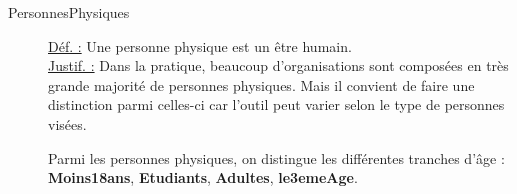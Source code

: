 \begin{description}
\item [PersonnesPhysiques]
\underline{Déf. :}  Une personne physique est un être humain.
\\ \underline{Justif. :}  Dans la pratique,  beaucoup d'organisations sont composées en très grande majorité de personnes physiques.  Mais il convient de faire une distinction parmi celles-ci car  l'outil peut varier  selon le type de personnes visées.
\newline

Parmi les personnes physiques,  on distingue les différentes tranches d'âge : \textbf{Moins18ans}, \textbf{Etudiants}, \textbf{Adultes}, \textbf{le3emeAge}.

%
%
%
%


\end{description}
